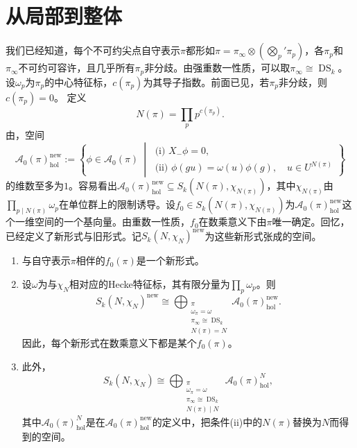 \section{从局部到整体}\label{L6S3}
我们已经知道，每个不可约尖点自守表示$\pi$都形如$\pi=\pi_\infty\otimes(\bigotimes_p'\pi_p)$，各$\pi_p$和$\pi_\infty$不可约可容许，且几乎所有$\pi_p$非分歧。由强重数一性质，可以取$\pi_\infty\cong\operatorname{DS}_k$。设$\omega_p$为$\pi_p$的中心特征标，$c(\pi_p)$为其导子指数。前面已见，若$\pi_p$非分歧，则$c(\pi_p)=0$。
定义
\[N(\pi)=\prod_p p^{c(\pi_p)}.\]
由，空间
\[\mathcal A_0(\pi)_{\mathrm{hol}}^{\mathrm{new}}:=\left\{\phi\in\mathcal A_0(\pi)\ \middle|\ \begin{array}{l}\text{(i) }X_-\phi=0,\\\text{(ii) }\phi(gu)=\omega(u)\phi(g),\quad u\in U^{N(\pi)}\end{array}\right\}\]
的维数至多为$1$。容易看出$\mathcal A_0(\pi)_{\mathrm{hol}}^{\mathrm{new}}\subseteq S_k(N(\pi),\chi_{N(\pi)})$，其中$\chi_{N(\pi)}$由$\prod_{p\mid N(\pi)}\omega_p$在单位群上的限制诱导。设$f_0\in S_k(N(\pi),\chi_{N(\pi)})$为$\mathcal A_0(\pi)_{\mathrm{hol}}^{\mathrm{new}}$这个一维空间的一个基向量。由重数一性质，$f_0$在数乘意义下由$\pi$唯一确定。回忆，已经定义了新形式与旧形式。记$S_k(N,\chi_N)^{\mathrm{new}}$为这些新形式张成的空间。
\begin{theorem}\label{L6S3O1}
\begin{enumerate}
\item 与自守表示$\pi$相伴的$f_0(\pi)$是一个新形式。
\item 设$\omega$为与$\chi_N$相对应的Hecke特征标，其有限分量为$\prod_p\omega_p$。则
\[S_k(N,\chi_N)^{\mathrm{new}}\cong\bigoplus_{\substack{\pi\\\omega_\pi=\omega\\\pi_\infty\cong\operatorname{DS}_k\\N(\pi)=N}}\mathcal A_0(\pi)_{\mathrm{hol}}^{\mathrm{new}}.\]
因此，每个新形式在数乘意义下都是某个$f_0(\pi)$。
\item 此外，
\[S_k(N,\chi_N)\cong\bigoplus_{\substack{\pi\\\omega_\pi=\omega\\\pi_\infty\cong\operatorname{DS}_k\\N(\pi)\mid N}}\mathcal A_0(\pi)_{\mathrm{hol}}^N,\]
其中$\mathcal A_0(\pi)_{\mathrm{hol}}^N$是在$\mathcal A_0(\pi)_{\mathrm{hol}}^{\mathrm{new}}$的定义中，把条件(ii)中的$N(\pi)$替换为$N$而得到的空间。
\end{enumerate}
\end{theorem}
